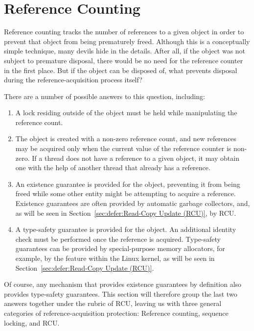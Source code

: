 
\section{Reference Counting}
\label{sec:defer:Reference Counting}

Reference counting tracks the number of references
to a given object in order to prevent that object from being prematurely
freed.
Although this is a conceptually simple technique, many devils hide in
the details.
After all, if the object was not subject to premature disposal,
there would be no need for the reference counter in the first place.
But if the object can be disposed of, what prevents disposal during
the reference-acquisition process itself?

There are a number of possible answers to this question, including:

\begin{enumerate}
\item	A lock residing outside of the object must be held while
	manipulating the reference count.
\item	The object is created with a non-zero reference count, and new
	references may be acquired only when the current value of
	the reference counter is non-zero.
	If a thread does not have a reference to a given object,
	it may obtain one with the help of another thread that
	already has a reference.
\item	An existence guarantee is provided for the object, preventing
	it from being freed while some other
	entity might be attempting to acquire a reference.
	Existence guarantees are often provided by automatic
	garbage collectors, and, as will be seen in
	Section~\ref{sec:defer:Read-Copy Update (RCU)}, by RCU.
\item	A type-safety guarantee is provided for the object.
	An additional identity check must be performed once
	the reference is acquired.
	Type-safety guarantees can be provided by special-purpose
	memory allocators, for example, by the
	 feature within the Linux kernel,
	as will be seen in Section~\ref{sec:defer:Read-Copy Update (RCU)}.
\end{enumerate}

Of course, any mechanism that provides existence guarantees
by definition also provides type-safety guarantees.
This section will therefore group the last two answers together under the
rubric of RCU, leaving us with three general categories of
reference-acquisition protection: Reference counting, sequence
locking, and RCU.

